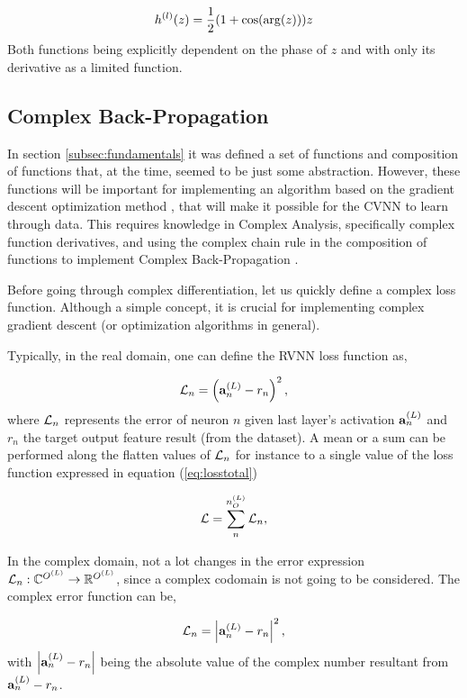\begin{equation}
	h^{(l)}(z) = \dfrac{1}{2} ( 1 + \cos(\arg(z)) ) z
\end{equation}
Both functions being explicitly dependent on the phase of $ z $ and with only its derivative as a limited function.

\subsection{Complex Back-Propagation}
In section \ref{subsec:fundamentals} it was defined a set of functions and composition of functions that, at the time, seemed to be just some abstraction. However, these functions will be important for implementing an algorithm based on the gradient descent optimization method \parencite{cauchy1847}, that will make it possible for the \gls{CVNN} to learn through data. This requires knowledge in Complex Analysis, specifically complex function derivatives, and using the complex chain rule in the composition of functions to implement Complex Back-Propagation \parencite{rumelhart1986}.

Before going through complex differentiation, let us quickly define a complex loss function. Although a simple concept, it is crucial for implementing complex gradient descent (or optimization algorithms in general).

Typically, in the real domain, one can define the \gls{RVNN} loss function as,

\begin{equation}
	\mathcal{L}_n = \left( \mathbf{a}^{(L)}_{n} - r_n \right)^2,
	\label{eq:error_cp}
\end{equation}
where $ \mathcal{L}_n $ represents the error of neuron $ n $ given last layer's activation $ \mathbf{a}^{(L)}_{n} $ and $ r_n $ the target output feature result (from the dataset). A mean or a sum can be performed along the flatten values of $ \mathcal{L}_n $ for instance to a single value of the loss function expressed in equation (\ref{eq:losstotal}) 

\begin{equation}
	\mathcal{L} = \sum_{n}^{n^{(L)}_{O}} \mathcal{L}_n,
	\label{eq:losstotal}
\end{equation}

In the complex domain, not a lot changes in the error expression $ \mathcal{L}_n: \mathbb{C}^{O^{(L)}} \rightarrow \mathbb{R}^{O^{(L)}} $, since a complex codomain is not going to be considered. The complex error function can be,

\begin{equation}
	\mathcal{L}_n = \left| \mathbf{a}^{(L)}_{n} - r_n \right|^2,
	\label{eq:cerror}
\end{equation}
with $ \left| \mathbf{a}^{(L)}_{n} - r_n \right| $ being the absolute value of the complex number resultant from $ \mathbf{a}^{(L)}_{n} - r_n $.


